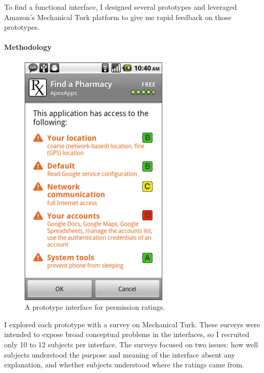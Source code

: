 \documentclass[11pt]{article}
\begin{document}
To find a functional interface, I designed several prototypes and 
leveraged Amazon's Mechanical Turk platform to give me rapid feedback 
on those prototypes.

\paragraph{Methodology}
\label{subsec-small-methods}

\begin{figure}
    \begin{center}
        \includegraphics[width=.8\linewidth]{img/GradesPerms.png}
    \end{center}
    \caption{A prototype interface for permission ratings.}
    \label{grade-perms}
\end{figure}

I explored each prototype with a survey on Mechanical Turk.
These surveys were 
intended to expose broad conceptual problems 
in the interfaces, so I recruited only 10 to 12 
subjects per interface. The surveys focused on two issues: how well subjects 
understood the purpose and meaning of the interface absent any explanation, 
and whether subjects understood where the ratings came from.
\end{document}
